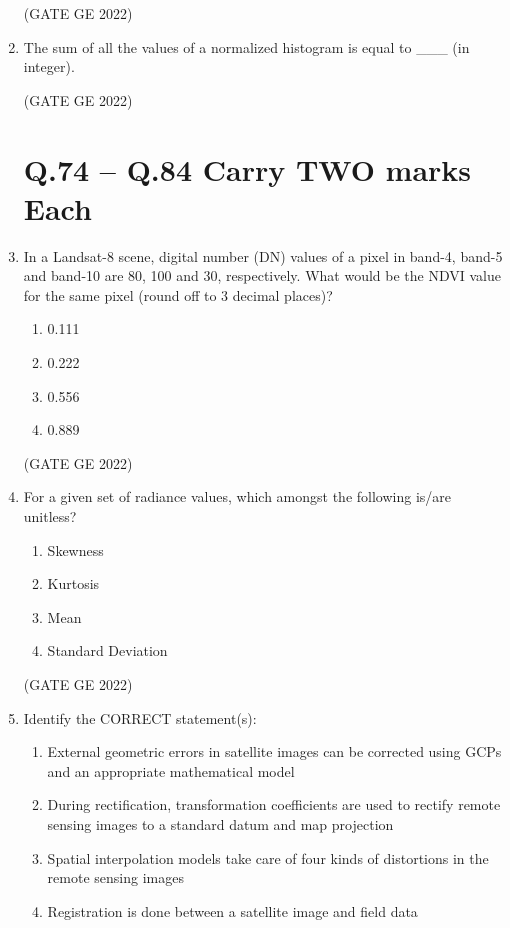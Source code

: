 \documentclass[a4paper, 11pt]{article}
\begin{document}
\begin{enumerate}
\hfill (GATE GE 2022)

\item The sum of all the values of a normalized histogram is equal to \_\_\_ (in integer).

\hfill (GATE GE 2022)

\section{\textbf{Q.74 – Q.84 Carry TWO marks Each}}

\item In a Landsat-8 scene, digital number (DN) values of a pixel in band-4, band-5 and band-10 are 80, 100 and 30, respectively. What would be the NDVI value for the same pixel (round off to 3 decimal places)?
\begin{enumerate}
    \item 0.111
    \item 0.222
    \item 0.556
    \item 0.889
\end{enumerate}

\hfill (GATE GE 2022)

\item For a given set of radiance values, which amongst the following is/are unitless?
\begin{enumerate}
    \item Skewness
    \item Kurtosis
    \item Mean
    \item Standard Deviation
\end{enumerate}

\hfill (GATE GE 2022)

\item Identify the CORRECT statement(s):
\begin{enumerate}
    \item External geometric errors in satellite images can be corrected using GCPs and an appropriate mathematical model
    \item During rectification, transformation coefficients are used to rectify remote sensing images to a standard datum and map projection
    \item Spatial interpolation models take care of four kinds of distortions in the remote sensing images
    \item Registration is done between a satellite image and field data
\end{enumerate}


\end{enumerate}
\end{document}
